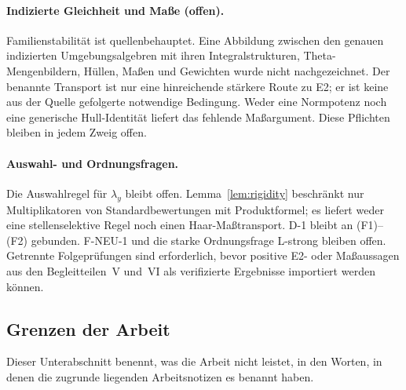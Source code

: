 \documentclass[11pt,a4paper]{article}
\theoremstyle{definition}
\theoremstyle{plain}
\theoremstyle{definition}
\begin{document}
\paragraph{Indizierte Gleichheit und Maße (offen).}
Familienstabilität ist quellenbehauptet. Eine Abbildung zwischen den
genauen indizierten Umgebungsalgebren mit ihren Integralstrukturen,
Theta-Mengenbildern, Hüllen, Maßen und Gewichten wurde nicht nachgezeichnet.
Der benannte Transport ist nur eine hinreichende stärkere Route zu E2;
er ist keine aus der Quelle gefolgerte notwendige Bedingung.
Weder eine Normpotenz noch eine generische Hull-Identität liefert das
fehlende Maßargument. Diese Pflichten bleiben in jedem Zweig offen.

\paragraph{Auswahl- und Ordnungsfragen.}
Die Auswahlregel für $\lambda_y$ bleibt offen.
Lemma~\ref{lem:rigidity} beschränkt nur Multiplikatoren von
Standardbewertungen mit Produktformel; es liefert weder eine
stellenselektive Regel noch einen Haar-Maßtransport.
D-1 bleibt an (F1)--(F2) gebunden. F-NEU-1 und die starke
Ordnungsfrage L-strong bleiben offen.
Getrennte Folgeprüfungen sind erforderlich, bevor positive E2- oder
Maßaussagen aus den Begleitteilen~V und~VI als verifizierte Ergebnisse
importiert werden können.

\subsection{Grenzen der Arbeit}
\label{sec:limitations}

Dieser Unterabschnitt benennt, was die Arbeit nicht leistet, in den Worten, in denen
die zugrunde liegenden Arbeitsnotizen es benannt haben.
\end{document}
